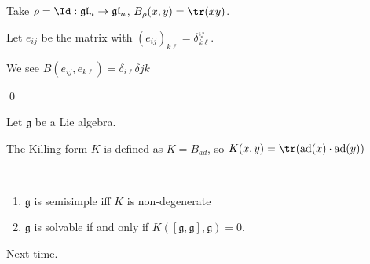 \documentclass[x11names,reqno,14pt]{extarticle}
\newcommand{\mk}[1]{\mathfrak{#1}}
\newcommand{\g}{\mk{g}}
\DeclareMathOperator{\ad}{ad}
\newcommand{\gl}{\mk{g}\mk{l}}
\begin{document}
Take $\rho = \Id:\gl_n\to\gl_n$, $B_\rho(x,y) = \tr(xy)$.

Let $e_{ij}$ be the matrix with $(e_{ij})_{k\ell} = \delta_{k\ell}^{ij}$.

We see $B(e_{ij},e_{k\ell}) = \delta_{i\ell}\delta{jk}$

\qed


Let $\g$ be a Lie algebra. 

The \underline{Killing form} $K$ is defined as $K = B_{ad}$, so $K(x,y) = \tr(\ad(x)\cdot\ad(y))$

\thm
\,
\begin{enumerate}[label=(\alph*)]

\item $\g$ is semisimple iff $K$ is non-degenerate

\item $\g$ is solvable if and only if $K([\g,\g],\g) = 0$.

\end{enumerate}

\proof

Next time.
\end{document}
